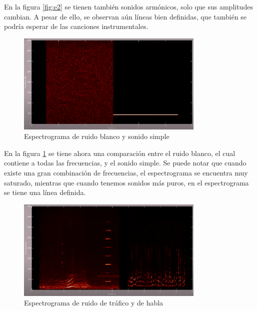 \documentclass[12pt, letterpaper]{article}
\begin{document}
\noindent En la figura \ref{fig:e2} se tienen también sonidos armónicos,
solo que sus amplitudes cambian. A pesar de ello, se observan aún líneas
bien definidas, que también se podría esperar de las canciones instrumentales.



\begin{figure}[H]
  \centering
  \includegraphics[width=0.8\textwidth]{espectrogramas_04.png}
  \caption{Espectrograma de ruido blanco y sonido simple \cite{Colomer-04}}
  \label{fig:e4}
\end{figure}

\noindent En la figura \ref{fig:e4} se tiene ahora una comparación entre
el ruido blanco, el cual contiene a todas las frecuencias, y el sonido simple.
Se puede notar que cuando existe una gran combinación de frecuencias, el espectrograma
se encuentra muy saturado, mientras que cuando tenemos sonidos más puros, en el
espectrograma se tiene una línea definida.

\begin{figure}[H]
  \centering
  \includegraphics[width=0.8\textwidth]{espectrogramas_05.png}
  \caption{Espectrograma de ruido de tráfico y de habla \cite{Colomer-05}}
  \label{fig:e5}
\end{figure}
\end{document}
